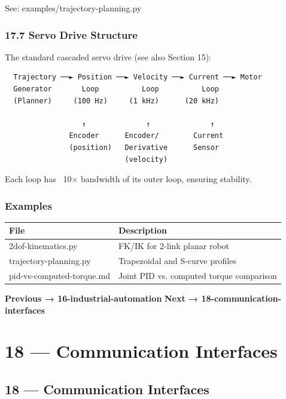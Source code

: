 \documentclass[11pt,a4paper]{book}
\begin{document}
\begin{itemize}
See: examples/trajectory-planning.py

\medskip\noindent\hrulefill\medskip

\subsection{17.7 Servo Drive Structure}

The standard cascaded servo drive (see also Section 15):

\begin{lstlisting}
  Trajectory ──► Position ──► Velocity ──► Current ──► Motor
  Generator       Loop          Loop          Loop
  (Planner)     (100 Hz)     (1 kHz)      (20 kHz)
  
                  ↑              ↑              ↑
               Encoder      Encoder/        Current
               (position)   Derivative      Sensor
                            (velocity)
\end{lstlisting}

Each loop has ~10× bandwidth of its outer loop, ensuring stability.

\medskip\noindent\hrulefill\medskip

\subsection{Examples}

\begin{center}
\begin{tabular}{|l|l|}
\hline
File & Description \\
\hline
2dof-kinematics.py & FK/IK for 2-link planar robot \\
trajectory-planning.py & Trapezoidal and S-curve profiles \\
pid-vs-computed-torque.md & Joint PID vs. computed torque comparison \\
\hline
\end{tabular}
\end{center}

\medskip\noindent\hrulefill\medskip

\textbf{Previous → 16-industrial-automation}  
\textbf{Next → 18-communication-interfaces}


\chapter{18 — Communication Interfaces}
\section{18 — Communication Interfaces}


\end{itemize}
\end{document}
